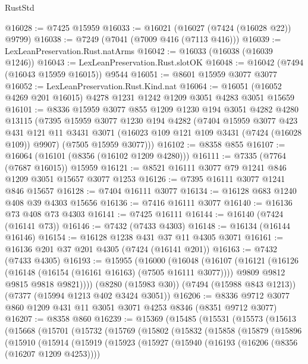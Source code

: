 \begin{lexlean}{RustStd}
\begin{coremodule}
@16028 := @7425 @15959
@16033 := @16021 (@16027 (@7424 (@16028 @22)) @9799)
@16038 := @7249 (@7041 (@7009 @416 (@7113 @416)))
@16039 := LexLeanPreservation.Rust.natArms
@16042 := @16033 (@16038 (@16039 @1246))
@16043 := LexLeanPreservation.Rust.slotOK
@16048 := @16042 (@7494 (@16043 @15959 @16015)) @9544
@16051 := @8601 @15959 @3077 @3077
@16052 := LexLeanPreservation.Rust.Kind.nat
@16064 := @16051 (@16052 @4269 @201 @16015) @4278 @1231 @1242 @1209 @3051 @4283 @3051 @15659
@16101 := @8336
    @15959
    @3077
    @855
    @1209
    @1230
    @194
    @3051
    @4282
    @4280
    @13115
    (@7395
      @15959
      @3077
      @1230
      @194
      @4282
      (@7404
        @15959
        @3077
        @423
        @431
        @121
        @11
        @3431
        @3071
        (@16023 @109 @121 @109 @3431 (@7424 (@16028 @109)) @9907)
        (@7505 @15959 @3077)))
@16102 := @8358 @855
@16107 := @16064 (@16101 (@8356 (@16102 @1209 @4280)))
@16111 := @7335 (@7764 (@7687 @16015)) @15959
@16121 := @8521 @16111 @3077 @79 @1241 @846 @1209 @3051 @15657 @3077 @1253
@16126 := @7395 @16111 @3077 @1241 @846 @15657
@16128 := @7404 @16111 @3077
@16134 := @16128 @683 @1240 @408 @39 @4303 @15656
@16136 := @7416 @16111 @3077
@16140 := @16136 @73 @408 @73 @4303
@16141 := @7425 @16111
@16144 := @16140 (@7424 (@16141 @73))
@16146 := @7432 (@7433 @4303)
@16148 := @16134 (@16144 @16146)
@16154 := @16128 @1238 @431 @37 @11 @4305 @3071
@16161 := @16136 @201 @37 @201 @4305 (@7424 (@16141 @201))
@16163 := @7432 (@7433 @4305)
@16193 := @15955
    (@16000
      (@16048
        (@16107
          (@16121
            (@16126 (@16148 (@16154 (@16161 @16163) (@7505 @16111 @3077))))
            @9809
            @9812
            @9815
            @9818
            @9821))))
    (@8280 (@15983 @30))
    (@7494 (@15988 @843 @1213))
    (@7377 (@15994 @1213 @402 @3424 @3051))
@16206 := @8336 @9712 @3077 @860 @1209 @431 @11 @3051 @3071 @4253 @8346 (@8351 @9712 @3077)
@16207 := @8358 @860
@16239 := @15369
    (@15485
      (@15531
        (@15573
          (@15613
            (@15668
              (@15701
                (@15732
                  (@15769
                    (@15802
                      (@15832
                        (@15858
                          (@15879
                            (@15896
                              (@15910
                                (@15914
                                  (@15919
                                    (@15923
                                      (@15927
                                        (@15940
                                          (@16193 (@16206 (@8356 (@16207 @1209 @4253))))

\end{coremodule}
\end{lexlean}
